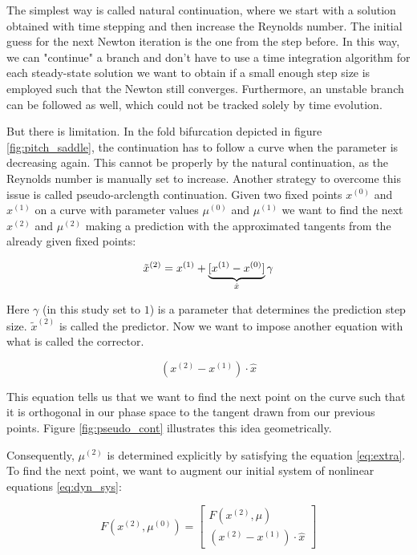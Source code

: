 The simplest way is called natural continuation, where we start with a solution
obtained with time stepping and then increase the Reynolds number. The initial
guess for the next Newton iteration is the one from the step before. In this
way, we can "continue" a branch and don't have to use a time integration
algorithm for each steady-state solution we want to obtain if a small enough
step size is employed such that the Newton still converges. Furthermore, an
unstable branch can be followed as well, which could not be tracked solely by
time evolution.

But there is limitation. In the fold bifurcation depicted in figure
\ref{fig:pitch_saddle}, the continuation has to follow a curve when the
parameter is decreasing again. This cannot be properly by the natural
continuation, as the Reynolds number is manually set to increase.
Another strategy to overcome this issue is called pseudo-arclength
continuation. Given two fixed points $x^{(0)}$ and $x^{(1)}$ on a curve with
parameter values $\mu^{(0)}$ and $\mu^{(1)}$ we want to find the next $x^{(2)}$
and $\mu^{(2)}$ making a prediction with the approximated tangents from the
already given fixed points:

\begin{equation}
  \tilde{x}^{(2)} = x^{(1)}  + \underbrace{[x^{(1)} - x^{(0)}]}_{\text{\normalfont $\hat{x}$}} \gamma
\end{equation}

Here $\gamma$ (in this study set to $1$) is a parameter that determines the
prediction step size. $\tilde{x}^{(2)}$ is called the predictor. Now we want to
impose another equation with what is called the corrector.

\begin{equation}
  (x^{(2)} - x^{(1)})  \cdot \hat{x} \label{eq:extra}
\end{equation}

This equation tells us that we want to find the next point on the curve such
that it is orthogonal in our phase space to the tangent drawn from our previous
points. Figure \ref{fig:pseudo_cont} illustrates this idea geometrically.

Consequently, $\mu^{(2)}$ is determined explicitly by satisfying the equation
\eqref{eq:extra}. To find the next point, we want to augment our initial system
of nonlinear equations \eqref{eq:dyn_sys}:

\begin{equation}
  F(x^{(2)}, \mu^{(0)}) = 
\begin{bmatrix} F(x^{(2)}, \mu) \\ (x^{(2)} - x^{(1)})  \cdot \hat{x}
\end{bmatrix} \label{eq:dyn_sys_cont}
\end{equation}

